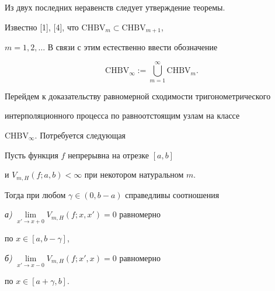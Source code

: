 Из двух последних неравенств следует утверждение теоремы.


\medskip





Известно [1], [4], что $\mathrm{CHBV}_m\subset \mathrm{CHBV}_{m+1}$,


$m=1,2,\dotsc$ В связи с этим естественно ввести обозначение 


$$


\mathrm{CHBV}_{\infty}:=\bigcup\limits_{m=1}^{\infty}\mathrm{CHBV}_m.


$$





Перейдем к доказательству равномерной сходимости тригонометрического


интерполяционного процесса по равноотстоящим узлам на классе


$\mathrm{CHBV}_{\infty}$. Потребуется следующая





\begin{lem}


Пусть функция $f$ непрерывна на отрезке $[a,b]$


и $V_{m,H}(f;a,b)<\infty$ при некотором натуральном $m$.


Тогда при любом $\gamma\in(0,b-a)$ справедливы соотношения





{\em а)} $\lim\limits_{x'\to x+0}V_{m,H}(f;x,x')=0$ равномерно 


по $x\in[a,b-\gamma]$,





{\em б)} $\lim\limits_{x'\to x-0}V_{m,H}(f;x',x)=0$ равномерно


по $x\in[a+\gamma,b]$.


\end{lem}






